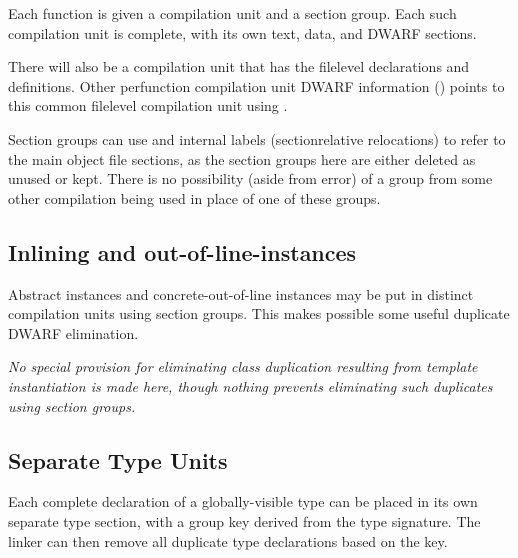 Each function is given a compilation unit and a section
group. Each such compilation unit is complete, with its own
text, data, and DWARF sections.

There will also be a compilation unit that has the file\dash level
declarations and definitions. Other per\dash function compilation
unit DWARF information (\dotdebuginfo{}) points to this common
file\dash level compilation unit using 
.

Section groups can use  and internal labels
(section\dash relative relocations) to refer to the main object
file sections, as the 
section groups here are either deleted
as unused or kept. There is no possibility (aside from error)
of a group from some other compilation being used in place
of one of these groups.


\subsection{Inlining and out-of-line-instances}
\label{app:inliningandoutoflineinstances}

Abstract instances
and concrete-out-of-line instances may be
put in distinct compilation units using 
section groups. 
This
makes possible some useful duplicate DWARF elimination.

\textit{No special provision for eliminating class duplication
resulting from template instantiation is made here, though
nothing prevents eliminating such duplicates using section
groups.}


\subsection{Separate Type Units}
\label{app:separatetypeunits}

Each complete declaration of a globally-visible type can be
placed in its own separate type section, with a group key
derived from the type signature. The linker can then remove
all duplicate type declarations based on the key.

